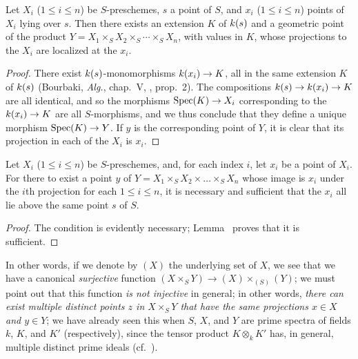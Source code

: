 \begin{lemma}[3.4.6]
\label{I.3.4.6}
Let $X_i$ ($1\leq i\leq n$) be $S$-preschemes, $s$ a point of $S$, and $x_i$
($1\leq i\leq n$) points of $X_i$ lying over $s$. Then there exists an extension
$K$ of $k(s)$ and a geometric point of the product
$Y=X_1\times_S X_2\times_S\cdots\times_S X_n$, with values in $K$, whose projections to
the $X_i$ are localized at the $x_i$.
\end{lemma}

\begin{proof}
\label{proof-I.3.4.6}
There exist $k(s)$-monomorphisms $\kres(x_i)\to K$, all in the same extension $K$ of $k(s)$ (Bourbaki, \emph{Alg.}, chap.~V, , prop.~2).
The compositions $\kres(s)\to\kres(x_i)\to K$ are all identical, and so the morphisms $\Spec(K)\to X_i$ corresponding to the $\kres(x_i)\to K$ are all $S$-morphisms, and we thus conclude that they define a unique morphism $\Spec(K)\to Y$.
If $y$ is the corresponding point of $Y$, it is clear that its projection in each of the $X_i$ is $x_i$.
\end{proof}

\begin{proposition}[3.4.7]
\label{I.3.4.7}
Let $X_i$ ($1\leq i\leq n$) be $S$-preschemes, and, for each index $i$, let $x_i$ be a point of $X_i$.
For there to exist a point $y$ of $Y=X_1\times_S X_2\times\ldots\times_S X_n$ whose image is $x_i$ under the $i$th projection for each $1\leq i\leq n$, it is necessary and sufficient that the $x_i$ all lie above the same point $s$ of $S$.
\end{proposition}

\begin{proof}
\label{proof-I.3.4.7}
The condition is evidently necessary; Lemma~ proves that it is sufficient.
\end{proof}

In other words, if we denote by $(X)$ the underlying set of $X$, we see that we have a canonical \emph{surjective} function $(X\times_S Y)\to(X)\times_{(S)}(Y)$; we must point out that this function \emph{is not injective} in general; in other words, \emph{there can exist multiple distinct points $z$ in $X\times_S Y$ that have the same projections $x\in X$ and $y\in Y$}; we have already seen this when $S$, $X$, and $Y$ are prime spectra of fields $k$, $K$, and $K'$ (respectively), since the tensor product $K\otimes_k K'$ has, in general, multiple distinct prime ideals (cf.~).

